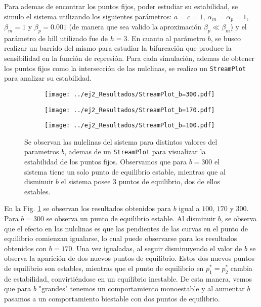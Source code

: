 Para ademas de encontrar los puntos fijos, poder estudiar su estabilidad, se simulo el sistema utilizando los siguientes parámetros: $a=c=1$, $\alpha_m = \alpha_p = 1$, $\beta_m = 1$ y $\beta_p = 0.001$ (de manera que sea valido la aproximación $\beta_p \ll \beta_m$) y el parámetro de hill utilizado fue de $h=3$. En cuanto al parámetro $b$, se busco realizar un barrido del mismo para estudiar la bifurcación que produce la sensibilidad en la función de represión. Para cada simulación, ademas de obtener los puntos fijos como la intersección de las nulclinas, se realizo un \texttt{StreamPlot} para analizar su estabilidad.

\begin{figure}[htb!]
    \centering
    \begin{subfigure}[b]{0.48\textwidth}
        \texttt{[image: ../ej2\_Resultados/StreamPlot\_b=300.pdf]}
    \end{subfigure}
    \begin{subfigure}[b]{0.48\textwidth}
        \texttt{[image: ../ej2\_Resultados/StreamPlot\_b=170.pdf]}
    \end{subfigure}
    \begin{subfigure}[b]{0.48\textwidth}
        \texttt{[image: ../ej2\_Resultados/StreamPlot\_b=100.pdf]}
    \end{subfigure}
    \caption{Se observan las nulclinas del sistema para distintos valores del parametros $b$, ademas de un \texttt{StreamPlot} para visualizar la estabilidad de los puntos fijos. Observamos que para $b=300$ el sistema tiene un solo punto de equilibrio estable, mientras que al disminuir $b$ el sistema posee 3 puntos de equilibrio, dos de ellos estables.}
    \label{ej2:StreamPlot}
\end{figure}

En la Fig. \ref{ej2:StreamPlot} se observan los resultados obtenidos para $b$ igual a $100$, $170$ y $300$. Para $b=300$ se observa un punto de equilibrio estable. Al disminuir $b$, se observa que el efecto en las nulclinas es que las pendientes de las curvas en el punto de equilibrio comienzan igualarse, lo cual puede observarse para los resultados obtenidos con $b=170$. Una vez igualadas, al seguir disminuyendo el valor de $b$ se observa la aparición de dos nuevos puntos de equilibrio. Estos dos nuevos puntos de equilibrio son estables, mientras que el punto de equilibrio en $p_1^* = p_2^*$ cambia de estabilidad, convirtiéndose en un equilibrio inestable. De esta manera, vemos que para $b$ "grandes" tenemos un comportamiento monoestable y al aumentar $b$ pasamos a un comportamiento biestable con dos puntos de equilibrio.